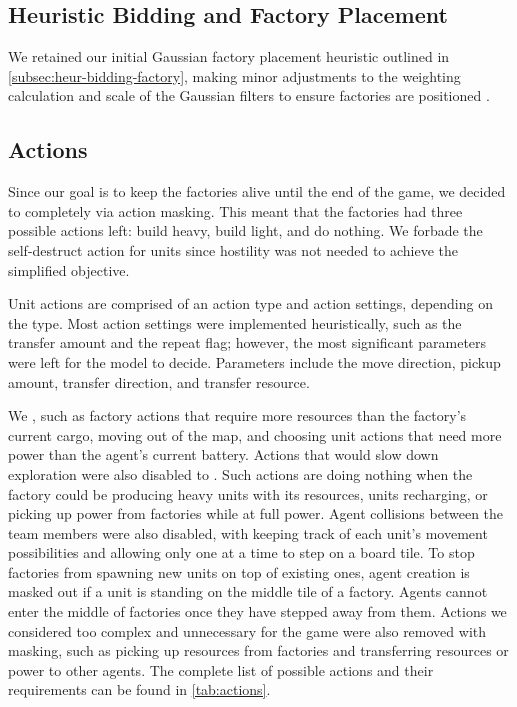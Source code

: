 \subsection{Heuristic Bidding and Factory Placement}

\noindent We retained our initial Gaussian factory placement heuristic outlined in \autoref{subsec:heur-bidding-factory}, making minor adjustments to the weighting calculation and scale of the Gaussian filters to ensure factories are positioned .


\subsection{Actions} \label{subsec:actions}

\noindent Since our goal is to keep the factories alive until the end of the game, we decided to  completely via action masking. This meant that the factories had three possible actions left: build heavy, build light, and do nothing. We forbade the self-destruct action for units since hostility was not needed to achieve the simplified objective.

\bigskip

\noindent Unit actions are comprised of an action type and action settings, depending on the type. Most action settings were implemented heuristically, such as the transfer amount and the repeat flag; however, the most significant parameters were left for the model to decide. Parameters include the move direction, pickup amount, transfer direction, and transfer resource.

\bigskip

\noindent We , such as factory actions that require more resources than the factory's current cargo, moving out of the map, and choosing unit actions that need more power than the agent's current battery. Actions that would slow down exploration were also disabled to . Such actions are doing nothing when the factory could be producing heavy units with its resources, units recharging, or picking up power from factories while at full power. Agent collisions between the team members were also disabled, with keeping track of each unit's movement possibilities and allowing only one at a time to step on a board tile. To stop factories from spawning new units on top of existing ones, agent creation is masked out if a unit is standing on the middle tile of a factory. Agents cannot enter the middle of factories once they have stepped away from them. Actions we considered too complex and unnecessary for the game were also removed with masking, such as picking up resources from factories and transferring resources or power to other agents. The complete list of possible actions and their requirements can be found in \autoref{tab:actions}.

